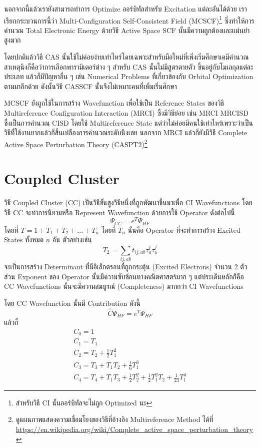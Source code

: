 นอกจากนี้แล้วเรายังสามารถทำการ Optimize ออร์บิทัลสำหรับ Excitation แต่ละอันได้ด้วย เราเรียกกระบวนการนี้ว่า Multi-Configuration Self-Consistent Field (MCSCF)\footnote{สำหรับวิธี CI นั้นออร์บิทัลจะไม่ถูก Optimized นะ} ซึ่งทำให้การคำนวณ Total Electronic Energy ด้วยวิธี Active Space SCF นั้นมีความถูกต้องและแม่นยำสูงมาก 

โดยปกติแล้ววิธี CAS นั้นใช้ไม่ค่อยง่ายเท่าไหร่โดยเฉพาะสำหรับมือใหม่ที่เพิ่งเริ่มศึกษาเคมีคำนวณ สาเหตุนึงก็คือว่าการเลือกพารามิเตอร์ต่าง ๆ สำหรับ CAS นั้นไม่มีสูตรตายตัว ขึ้นอยู่กับโมเลกุลแต่ละประเภท แล้วก็มีปัญหาอื่น ๆ เช่น Numerical Problems ที่เกี่ยวข้องกับ Orbital Optimization ตามมาอีกด้วย ดังนั้นวิธี CASSCF นั้นจึงไม่เหมาะคนที่เพิ่มเริ่มศึกษา

MCSCF ยังถูกใช้ในการสร้าง Wavefunction เพื่อใช้เป็น Reference States ของวิธี Multireference Configuration Interaction (MRCI) ซึ่งมีวิธีย่อย เช่น MRCI MRCISD ซึ่งเป็นการคำนวณ CISD โดยใช้ Multireference State แต่ว่าไม่ค่อยมีคนใช้เท่าไหร่เพราะว่าเป็นวิธีที่ใช้งานยากแล้วก็สิ้นเปลืองการคำนวณระดับนึงเลย นอกจาก MRCI แล้วก็ยังมีวิธี Complete Active Space Perturbation Theory (CASPT2)\footnote{ดูแผนภาพแสดงความเชื่อมโยงของวิธีที่อ้างอิง Multireference Method ได้ที่ \url{https://en.wikipedia.org/wiki/Complete_active_space_perturbation_theory}}

\section{Coupled Cluster}

วิธี Coupled Cluster (CC) เป็นวิธีขั้นสูงวิธีหนึ่งที่ถูกพัฒนาขึ้นมาเพื่อ CI Wavefunctions โดยวิธี CC จะทำการนิยามหรือ Represent Wavefunction ด้วยการใช้ Operator ดังต่อไปนี้
%
\begin{equation}
    \Psi_{CC} = e^{T} \Psi_{HF}
\end{equation}
%
\noindent โดยที่ $T = 1 + T_{1} + T_{2} + \dots + T_{n}$ โดยที่ $T_{n}$ นั้นคือ
Operator ที่จะทำการสร้าง Excited States ทั้งหมด $n$ อัน
%
ตัวอย่างเช่น
%
\begin{equation}
    T_{2} = \sum_{ij,ab} t_{ij,ab} \tau^{i}_{a} \tau^{j}_{b}
\end{equation}
%
จะเป็นการสร้าง Determinant ที่มีอิเล็กตรอนที่ถูกกระตุ้น (Excited Electrons) จำนวน 2 ตัว ส่วน Exponent ของ Operator นั้นมีความซับซ้อนทางคณิตศาสตร์มาก ๆ แต่ประเด็นหลักก็คือ CC Wavefunctions นั้นจะมีความสมบูรณ์ (Completeness) มากกว่า CI Wavefunctions

โดย CC Wavefunction นั้นมี Contribution ดังนี้
%
\begin{equation}
    \hat{C} \Psi_{HF} = e^{T} \Psi_{HF}
\end{equation}
%
แล้วก็
%
\begin{gather}
    C_{0} = 1 \\
    C_{1} = T_{1} \\
    C_{2} = T_{2} + \frac{1}{2}T^{2}_{1} \\
    C_{3} = T_{3} + T_{1}T_{2} + \frac{1}{6}T^{3}_{1} \\
    C_{4} = T_{4} + T_{1}T_{3} + \frac{1}{2}T^{2}_{2}
    + \frac{1}{2}T^{2}_{1} T_{2} + \frac{1}{24}T^{4}_{1}
\end{gather}


